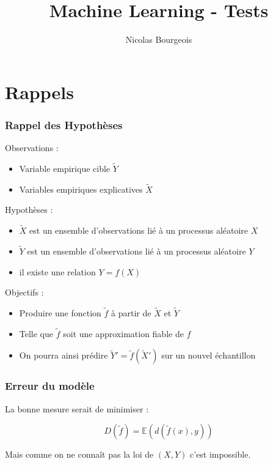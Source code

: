 \documentclass[11pt]{beamer}
\title{Machine Learning - Tests}
\author{Nicolas Bourgeois}
\date{}
\newenvironment{slide}[1]{%
\begin{frame}[environment=slide]
\frametitle{#1}
}{%
\end{frame}
}
\begin{document}
\begin{frame}
\maketitle
\end{frame}
\section{Rappels}

\begin{slide}{Rappel des Hypothèses}
Observations :\\

\begin{itemize}

\item Variable empirique cible $\tilde{Y}$
\item Variables empiriques explicatives $\tilde{X}$

\end{itemize}

\pause

Hypothèses :\\

\begin{itemize}

\item $\tilde{X}$ est un ensemble d'observations lié à un processus aléatoire $X$
\item $\tilde{Y}$ est un ensemble d'observations lié à un processus aléatoire $Y$
\item il existe une relation $Y = f(X)$

\end{itemize}

\pause

Objectifs :\\

\begin{itemize}
\item Produire une fonction $\tilde{f}$ à partir de $\tilde{X}$ et $\tilde{Y}$
\item Telle que $\tilde{f}$ soit une approximation fiable de $f$
\item On pourra ainsi prédire $\tilde{Y}' = \tilde{f}(\tilde{X}')$ sur un nouvel échantillon 
\end{itemize}

\end{slide}


\begin{slide}{Erreur du modèle}

La bonne mesure serait de minimiser :

$$D(\tilde{f}) = \mathbb{E}(d(\tilde{f}(x),y))$$

Mais comme on ne connaît pas la loi de $(X,Y)$ c'est impossible.

\end{slide}
\end{document}
